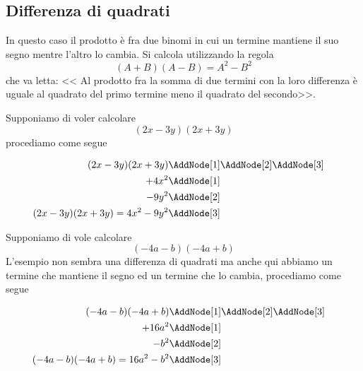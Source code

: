 \subsection{Differenza di quadrati}
In questo caso il prodotto è fra due binomi in cui un termine mantiene il suo segno mentre l'altro lo cambia. Si calcola utilizzando la regola \[(A+B)(A-B)=A^2-B^2 \] che va letta: << Al prodotto fra la somma di due termini con la loro differenza è uguale al quadrato del primo termine meno il quadrato del secondo>>.
\begin{center}

\end{center}
\begin{esempio}
Supponiamo di voler calcolare \[(2x-3y)(2x+3y)\]
procediamo come segue
\begin{NodesList}
	\begin{align*}
		(2x-3y)(2x+3y)&\AddNode[1]\AddNode[2]\AddNode[3]\\
		+4x^2&\AddNode[1]&\\ 
		-9y^2&\AddNode[2]&\\
		(2x-3y)(2x+3y)=4x^2-9y^2&\AddNode[3]
	\end{align*}
\end{NodesList}
\end{esempio}
\begin{esempio}
Supponiamo di vole calcolare \[(-4a-b)(-4a+b)\]
L'esempio non sembra una differenza di quadrati ma anche qui abbiamo un termine che mantiene il segno ed un termine che lo cambia, procediamo come segue
\begin{NodesList}
	\begin{align*}
		(-4a-b)(-4a+b)&\AddNode[1]\AddNode[2]\AddNode[3]\\
		+16a^2&\AddNode[1]&\\ 
		-b^2&\AddNode[2]&\\
		(-4a-b)(-4a+b)=16a^2-b^2&\AddNode[3]
	\end{align*}
\end{NodesList}
\end{esempio}
